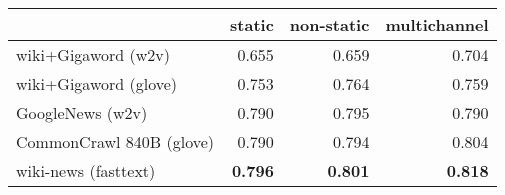 \begin{tabular}{lrrr}
\toprule
{} &  static &  non-static &  multichannel \\
\midrule
wiki+Gigaword (w2v)      &   0.655 &       0.659 &         0.704 \\
wiki+Gigaword (glove)    &   0.753 &       0.764 &         0.759 \\
GoogleNews (w2v)         &   0.790 &       0.795 &         0.790 \\
CommonCrawl 840B (glove) &   0.790 &       0.794 &         0.804 \\
wiki-news (fasttext)     &   \textbf{0.796} &       \textbf{0.801} &         \textbf{0.818} \\
\bottomrule
\end{tabular}
